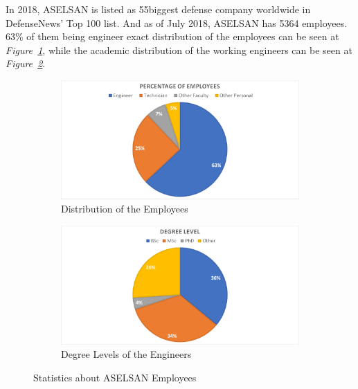 
	In 2018, ASELSAN is listed as 55\nth biggest defense company worldwide in DefenseNews' Top 100 list\cite{defense}. And as of July 2018, ASELSAN has 5364 employees. 63\% of them being engineer exact distribution of the employees can be seen at \textit{Figure~\ref{fig:calisan}}, while the academic distribution of the working engineers can be seen at \textit{Figure~\ref{fig:degree}}.





\begin{figure}[H]
	\setlength{\unitlength}{\textwidth} 
	\centering
	\begin{subfigure}{.5\textwidth}
  		\centering
  		\includegraphics[width=0.48\unitlength]{calisan}
  		\caption{\label{fig:calisan}Distribution of the Employees }
	\end{subfigure}%
	\begin{subfigure}{.5\textwidth}
  		\centering
		\includegraphics[width=0.48\unitlength]{degree}
  		\caption{\label{fig:degree}Degree Levels of the Engineers }
	\end{subfigure}
\caption{\label{fig:calisandegree} Statistics about ASELSAN Employees   }
\end{figure}



